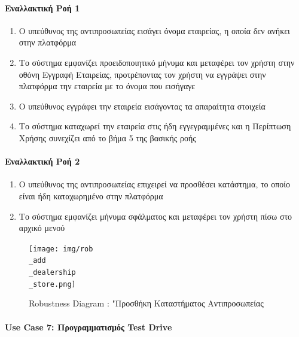 \documentclass{../ol-softwaremanual}
\begin{document}
	\paragraph{Εναλλακτική Ροή 1}
	
	\begin{enumerate}
		\item Ο υπεύθυνος της αντιπροσωπείας εισάγει όνομα εταιρείας, η οποία δεν ανήκει στην πλατφόρμα
		\item Το σύστημα εμφανίζει προειδοποιητικό μήνυμα και μεταφέρει τον χρήστη στην οθόνη Εγγραφή Εταιρείας, προτρέποντας τον χρήστη να εγγράψει στην πλατφόρμα την εταιρεία με το όνομα που εισήγαγε		
		\item Ο υπεύθυνος εγγράφει την εταιρεία εισάγοντας τα απαραίτητα στοιχεία
		\item Το σύστημα καταχωρεί την εταιρεία στις ήδη εγγεγραμμένες και η Περίπτωση Χρήσης συνεχίζει από το βήμα 5 της βασικής ροής
	\end{enumerate}
	
	\paragraph{Εναλλακτική Ροή 2}
	
	\begin{enumerate}
		\item Ο υπεύθυνος της αντιπροσωπείας επιχειρεί να προσθέσει κατάστημα, το οποίο είναι ήδη καταχωρημένο στην πλατφόρμα
		\item Το σύστημα εμφανίζει μήνυμα σφάλματος και μεταφέρει τον χρήστη πίσω στο αρχικό μενού
	\end{enumerate}
	
	\begin{figure}[htbp!]
		\texttt{[image: img/rob\\\_add\\\_dealership\\\_store.png]}
		\caption{\en Robustness Diagram : "\gr Προσθήκη Καταστήματος Αντιπροσωπείας}
	\end{figure}
	
	
	\newpage
	\centering
	\paragraph{\en Use Case 7: \gr Προγραμματισμός \en Test Drive \gr}
	
\end{document}
